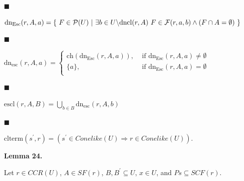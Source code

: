 \documentclass[10pt,a4paper]{amsart}
\begin{document}
 
 
\par\noindent  $\blacksquare$ 
 
$\mathrm{dn_{Esc}}(r,A,a)=\{\leavevmode\nobreak\ F\in\mathcal{P}(U)\leavevmode%
\nobreak\ |\leavevmode\nobreak\ \exists b\in U\backslash\mathrm{dncl}(r,A)%
\leavevmode\nobreak\ F\in\mathcal{F}(r,a,b)\wedge(F\cap A=\emptyset)%
\leavevmode\nobreak\ \}$\par
 
 
 
\par\noindent  $\blacksquare$ 
 
$\mathrm{dn_{esc}}(r,A,a)=\begin{cases}\mathrm{ch}(\mathrm{dn_{Esc}}(r,A,a)),&%
\text{ if }\mathrm{dn_{Esc}}(r,A,a)\neq\emptyset\\
\{a\},&\text{ if }\mathrm{dn_{Esc}}(r,A,a)=\emptyset\\
\end{cases}$\par
 
 
 
\par\noindent  $\blacksquare$ 
 
$\mathrm{escl}(r,A,B)=\bigcup_{b\in B}\mathrm{dn_{esc}}(r,A,b)$\par
 
 
 
\par\noindent  $\blacksquare$ 
 
$\mathrm{clterm}(s^{\prime},r)=(s^{\prime}\in Conelike(U)\Rightarrow r\in
Conelike%
(U))$.\par
 
 
  
 
 
\par\medskip\noindent\textbf{Lemma 24.}\par
 
 
Let $r\in CCR(U)$, $A\in SF(r)$, $B,B^{\prime}\subseteq U$, $x\in U$, and $Ps\subseteq SCF(r)$.\par
 
 
 
\end{document}
